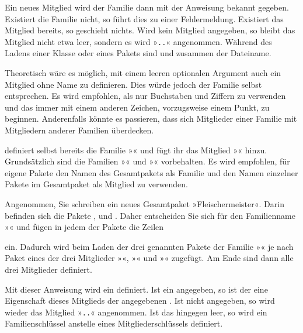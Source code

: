Ein neues Mitglied wird der Familie dann mit der Anweisung
 bekannt gegeben. Existiert die Familie nicht, so
führt dies zu einer Fehlermeldung. Existiert das Mitglied bereits, so
geschieht nichts. Wird kein Mitglied angegeben, so bleibt das Mitglied nicht
etwa leer, sondern es wird
»\texttt{.}\texttt{.}« angenommen. Während
des Ladens einer Klasse oder eines Pakets sind  und
 zusammen der Dateiname.

Theoretisch wäre es möglich, mit einem leeren optionalen Argument
 auch ein Mitglied ohne Name zu definieren. Dies würde jedoch
der Familie selbst entsprechen. Es wird empfohlen, als  nur
Buchstaben und Ziffern zu verwenden und das  immer mit einem
anderen Zeichen, vorzugsweise einem Punkt, zu beginnen. Anderenfalls könnte
es passieren, dass sich Mitglieder einer Familie mit Mitgliedern anderer
Familien überdecken.

 definiert selbst bereits die Familie »« und
fügt ihr das Mitglied »« hinzu. Grundsätzlich sind die
Familien »« und »« \KOMAScript{} vorbehalten. Es
wird empfohlen, für eigene Pakete den Namen des Gesamtpakets als Familie und
den Namen einzelner Pakete im Gesamtpaket als Mitglied zu verwenden.
%
\begin{Example}
  Angenommen, Sie schreiben ein neues Gesamtpaket »Fleischermeister«. Darin
  befinden sich die Pakete ,  und
  . Daher entscheiden Sie sich für den Familienname
  »« und fügen in jedem der Pakete die Zeilen
\begin{lstcode}
\end{lstcode}
  ein. Dadurch wird beim Laden der drei genannten Pakete der Familie
  »« je nach Paket eines der drei Mitglieder
  »«, »« und
  »« zugefügt. Am Ende sind dann alle drei Mitglieder
  definiert.
\end{Example}
%
\EndIndexGroup
\ExampleEndFix


\begin{Declaration}
\end{Declaration}
Mit dieser Anweisung wird ein  definiert. Ist ein
 angegeben, so ist der  eine Eigenschaft
dieses Mitglieds der angegebenen . Ist
 nicht angegeben, so wird wieder das Mitglied
»\texttt{.}\texttt{.}« angenommen. Ist das
 hingegen leer, so wird ein Familienschlüssel anstelle eines
Mitgliederschlüssels definiert.

